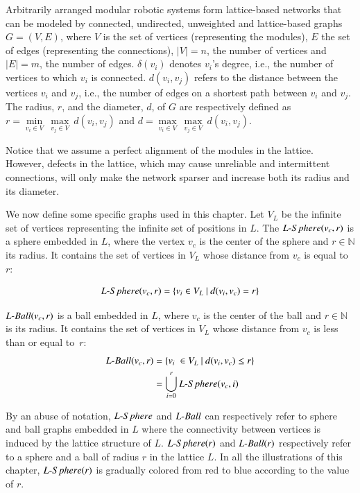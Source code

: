 Arbitrarily arranged modular robotic systems form lattice-based networks that can be modeled by connected, undirected, unweighted and lattice-based graphs $G = (V, E)$, where $V$ is the set of vertices (representing the modules), $E$ the set of edges (representing the connections), $|V|=n$, the number of vertices and $|E|= m$, the number of edges. $\delta(v_i)$ denotes $v_i$'s degree, i.e., the number of vertices to which $v_i$ is connected. $d(v_i,v_j)$ refers to the distance between the vertices $v_i$ and $v_j$, i.e., the number of edges on a shortest path between $v_i$ and $v_j$. The radius, $r$, and the diameter, $d$, of $G$ are respectively defined as $r = \min\limits_{v_i \in V}\ \max\limits_{v_j \in V}\ d(v_i,v_j)$ and $d = \max\limits_{v_i \in V}\ \max\limits_{v_j \in V}\  d(v_i,v_j)$. 

Notice that we assume a perfect alignment of the modules in the lattice. However, defects in the lattice, which may cause unreliable and intermittent connections, will only make the network sparser and increase both its radius and its diameter.

We now define some specific graphs used in this chapter. Let $V_L$ be the infinite set of vertices representing the infinite set of positions in $L$. The $\mathop{L{\textnormal{-}Sphere}}(v_c,r)$ is a sphere embedded in $L$, where the vertex $v_c$ is the center of the sphere and $r \in \mathbb{N}$ its radius. It contains the set of vertices in $V_L$ whose distance from $v_c$ is equal to~$r$:

\begin{align}
\label{eq:def:sphere}
\mathop{L{\textnormal{-}Sphere}}(v_c,r) = \{v_i \in V_L\ |\ d(v_i,v_c) = r\}
\end{align}

$\mathop{L{\textnormal{-}Ball}}(v_c,r)$ is a ball embedded in $L$, where $v_c$ is the center of the ball and $r \in \mathbb{N}$ is its radius. It contains the set of vertices in $V_L$ whose distance from $v_c$ is less than or equal to~$r$:
\begin{align}
\label{eq:def:ball}
\mathop{L{\textnormal{-}Ball}}(v_c,r) & = \{v_i\ \in V_L\ |\ d(v_i,v_c) \leq r\}\\
& = \bigcup\limits_{i=0}^{r} \mathop{L{\textnormal{-}Sphere}}(v_c,i)
\end{align}

By an abuse of notation, $\mathop{L{\textnormal{-}Sphere}}$ and $\mathop{L{\textnormal{-}Ball}}$ can respectively refer to sphere and ball graphs embedded in $L$ where the connectivity between vertices is induced by the lattice structure of $L$. $\mathop{L{\textnormal{-}Sphere}}(r)$ and $\mathop{L{\textnormal{-}Ball}}(r)$ respectively refer to a sphere and a ball of radius $r$ in the lattice $L$. In all the illustrations of this chapter, $\mathop{L{\textnormal{-}Sphere}}(r)$ is gradually colored from red to blue according to the value of $r$.

